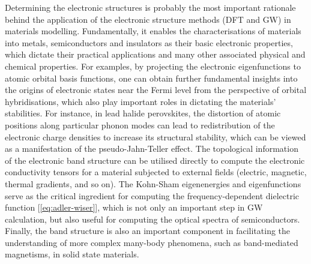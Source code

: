 
Determining the electronic structures is probably the most important rationale behind the application of the electronic structure methods (DFT and GW) in materials modelling. Fundamentally, it enables the characterisations of materials into metals, semiconductors and insulators as their basic electronic properties, which dictate their practical applications and many other associated physical and chemical properties. For examples, by projecting the electronic eigenfunctions to atomic orbital basis functions, one can obtain further fundamental insights into the origins of electronic states near the Fermi level from the perspective of orbital hybridisations,\cite{dronskowski1993crystal} which also play important roles in dictating the materials' stabilities. For instance, in lead halide perovskites, the distortion of atomic positions along particular phonon modes can lead to redistribution of the electronic charge densities to increase its structural stability,\cite{yang2020composition} which can be viewed as a manifestation of the pseudo-Jahn-Teller effect.\cite{bersuker2013pseudo} The topological information of the electronic band structure can be utilised directly to compute the electronic conductivity tensors for a material subjected to external fields (electric, magnetic, thermal gradients, and so on). The Kohn-Sham eigenenergies and eigenfunctions serve as the critical ingredient for computing the frequency-dependent dielectric function  [\cref{eq:adler-wiser}], which is not only an important step in GW calculation, but also useful for computing the optical spectra of semiconductors.\cite{ramasubramaniam2012large} Finally, the band structure is also an important component in facilitating the understanding of more complex many-body phenomena, such as band-mediated magnetisms,\cite{walsh2008theoretical} in solid state materials.

